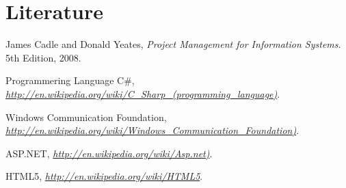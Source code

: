 \section{Literature}
\begin{thebibliography}{9}

  James Cadle and Donald Yeates,
  \emph{Project Management for Information Systems}.
  5th Edition,
  2008.

	Programmering Language C\#, 
  \emph{\url{http://en.wikipedia.org/wiki/C_Sharp_(programming_language)}}.
  
	Windows Communication Foundation, 
  \emph{\url{http://en.wikipedia.org/wiki/Windows_Communication_Foundation)}}.
  
	ASP.NET, 
  \emph{\url{http://en.wikipedia.org/wiki/Asp.net)}}.
  
	HTML5, 
  \emph{\url{http://en.wikipedia.org/wiki/HTML5}}.
  

\end{thebibliography}